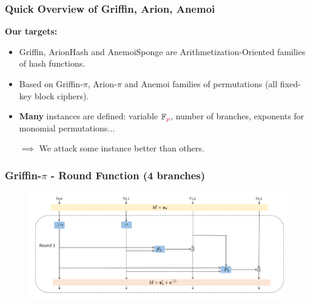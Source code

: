 \documentclass[aspectratio=169]{beamer}
\newcommand\p{{\textcolor{purple}{p}}}
\begin{document}


\begin{frame}
  \frametitle{Quick Overview of Griffin, Arion, Anemoi}

  \textbf{Our targets:}

    \begin{center}
  \end{center}

  \begin{itemize}
  \item Griffin, ArionHash and AnemoiSponge are Arithmetization-Oriented families of hash functions.
  \item Based on Griffin-$\pi$, Arion-$\pi$ and Anemoi families of permutations (all fixed-key block ciphers).

    \pause
  \item \textbf{Many} instances are defined: variable $\mathbb{F}_\p$, number of branches, exponents for monomial permutations...

    \begin{center}
      \textcolor{myred}{$\implies$ We attack some instance better than others.}
    \end{center}

  \end{itemize}
\end{frame}


\begin{frame}
  \frametitle{Griffin-$\pi$ - Round Function (4 branches)}
  \begin{figure}
    \centering
    \includegraphics[width=.9\textwidth]{./figures/griffin-round.png}
  \end{figure}

  \vspace{25pt}
  \end{frame}
\end{document}
